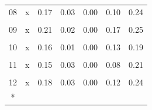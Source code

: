 \begin{longtable}[t]{ccrrrrr}
08 & x & 0.17 & 0.03 & 0.00 & 0.10 & 0.24\\
\cellcolor{gray!10}{09} & \cellcolor{gray!10}{(Intercept)} & \cellcolor{gray!10}{-2618.48} & \cellcolor{gray!10}{5336.53} & \cellcolor{gray!10}{0.63} & \cellcolor{gray!10}{-14245.78} & \cellcolor{gray!10}{9008.81}\\
09 & x & 0.21 & 0.02 & 0.00 & 0.17 & 0.25\\
\cellcolor{gray!10}{10} & \cellcolor{gray!10}{(Intercept)} & \cellcolor{gray!10}{3380.42} & \cellcolor{gray!10}{2753.98} & \cellcolor{gray!10}{0.24} & \cellcolor{gray!10}{-2619.98} & \cellcolor{gray!10}{9380.83}\\
10 & x & 0.16 & 0.01 & 0.00 & 0.13 & 0.19\\
\cellcolor{gray!10}{11} & \cellcolor{gray!10}{(Intercept)} & \cellcolor{gray!10}{5468.37} & \cellcolor{gray!10}{2790.39} & \cellcolor{gray!10}{0.07} & \cellcolor{gray!10}{-611.37} & \cellcolor{gray!10}{11548.10}\\
11 & x & 0.15 & 0.03 & 0.00 & 0.08 & 0.21\\
\cellcolor{gray!10}{12} & \cellcolor{gray!10}{(Intercept)} & \cellcolor{gray!10}{1216.08} & \cellcolor{gray!10}{1397.01} & \cellcolor{gray!10}{0.40} & \cellcolor{gray!10}{-1827.75} & \cellcolor{gray!10}{4259.91}\\
12 & x & 0.18 & 0.03 & 0.00 & 0.12 & 0.24\\*
\end{longtable}
